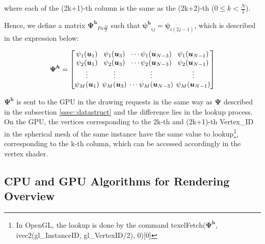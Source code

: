 \documentclass[twoside,twocolumn,10pt]{article}
\begin{document}
where each of the (2k+1)-th column is the same as the (2k+2)-th ($0 \leq k < \frac{N}{2}$).

Hence, we define a matrix $\bm{\Psi^h}_{Px\frac{M}{2}}$ such that $\bm{\psi^h}_{ij} = \bm{\psi}_{i(2j-1)}$, which is described in the expression below:


\begin{equation*}
\label{eq::Psi_changed}
\bm{\Psi^h} = 
\begingroup %
\setlength\arraycolsep{2pt}
\begin{bmatrix} 
    \psi_1(\bm{u}_1) & \psi_1(\bm{u}_3) & \cdots \psi_1(\bm{u}_{N-3}) & \psi_1(\bm{u}_{N-1})  \\
    
     \psi_2(\bm{u}_1)& \psi_2(\bm{u}_3) & \cdots \psi_2(\bm{u}_{N-3}) & \psi_2(\bm{u}_{N-1}) \\

    \vdots & \vdots & \vdots & \vdots  \\
    
     \psi_M(\bm{u}_1)&\psi_M(\bm{u}_3) & \cdots \psi_M(\bm{u}_{N-3}) & \psi_M(\bm{u}_{N-1})
    
\end{bmatrix}
\endgroup
\end{equation*}

$\bm{\Psi^h}$ is sent to the GPU in the drawing requests in the same way as $\bm{\Psi}$ described in the subsection \ref{ssec::datastruct} and the difference lies in the lookup process. On the GPU, the vertices corresponding to the 2k-th and (2k+1)-th Vertex\_ID in the spherical mesh of the same instance have the same value to lookup\footnote{In OpenGL, the lookup is done by the command texelFetch($\bm{\Psi^h}$, ivec2(gl\_InstanceID, gl\_VertexID/2), 0)[0]}, corresponding to the k-th column, which can be accessed accordingly in the vertex shader.



\subsection{CPU and GPU Algorithms for Rendering Overview}
\label{ssec::rendering}
\end{document}
